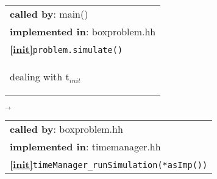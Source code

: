 \begin{landscape}
{%
  \begin{tabular}{|l|}
    \hline
    \textbf{called by}: main() \\
    \textbf{implemented in}: boxproblem.hh \\  
    \textbf{\textcircled{\ref{init}}}\verb+problem.simulate()+ \\
    \begin{scriptsize}dealing with t$_{init}$\end{scriptsize}\\\hline
  \end{tabular}
    $\overrightarrow{}$
  \begin{tabular}{|l|}\hline
    \textbf{called by}: {boxproblem.hh}\\
    \textbf{implemented in}: {timemanager.hh}\\  
    \textbf{\textcircled{\ref{init}}}\verb+timeManager_runSimulation(*asImp())+\\ \hline

\end{tabular}}
\end{landscape}
